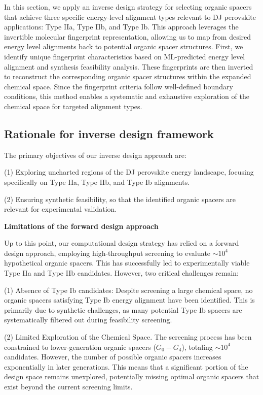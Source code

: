 In this section, we apply an inverse design strategy for selecting organic spacers that achieve three specific energy-level alignment types relevant to DJ perovskite applications: Type IIa, Type IIb, and Type Ib. This approach leverages the invertible molecular fingerprint representation, allowing us to map from desired energy level alignments back to potential organic spacer structures. First, we identify unique fingerprint characteristics based on ML-predicted energy level alignment and synthesis feasibility analysis. These fingerprints are then inverted to reconstruct the corresponding organic spacer structures within the expanded chemical space. Since the fingerprint criteria follow well-defined boundary conditions, this method enables a systematic and exhaustive exploration of the chemical space for targeted alignment types.

\subsection{Rationale for inverse design framework}

The primary objectives of our inverse design approach are:

(1)	Exploring uncharted regions of the DJ perovskite energy landscape, focusing specifically on Type IIa, Type IIb, and Type Ib alignments.

(2)	Ensuring synthetic feasibility, so that the identified organic spacers are relevant for experimental validation.

\textbf{Limitations of the forward design approach}

Up to this point, our computational design strategy has relied on a forward design approach, employing high-throughput screening to evaluate $\sim10^4$ hypothetical organic spacers. This has successfully led to experimentally viable Type IIa and Type IIb candidates. However, two critical challenges remain:

(1)	Absence of Type Ib candidates: Despite screening a large chemical space, no organic spacers satisfying Type Ib energy alignment have been identified. This is primarily due to synthetic challenges, as many potential Type Ib spacers are systematically filtered out during feasibility screening.

(2)	Limited Exploration of the Chemical Space. The screening process has been constrained to lower-generation organic spacers ($G_0-G_4$), totaling $\sim10^4$ candidates. However, the number of possible organic spacers increases exponentially in later generations. This means that a significant portion of the design space remains unexplored, potentially missing optimal organic spacers that exist beyond the current screening limits.


